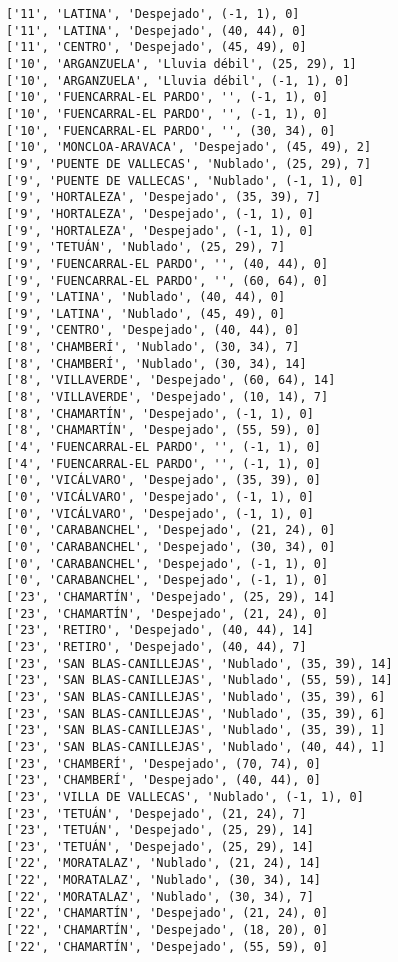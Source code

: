 \documentclass[11pt]{article}
\begin{document}
\begin{Verbatim}[commandchars=\\\{\}]
['11', 'LATINA', 'Despejado', (-1, 1), 0]
['11', 'LATINA', 'Despejado', (40, 44), 0]
['11', 'CENTRO', 'Despejado', (45, 49), 0]
['10', 'ARGANZUELA', 'Lluvia débil', (25, 29), 1]
['10', 'ARGANZUELA', 'Lluvia débil', (-1, 1), 0]
['10', 'FUENCARRAL-EL PARDO', '', (-1, 1), 0]
['10', 'FUENCARRAL-EL PARDO', '', (-1, 1), 0]
['10', 'FUENCARRAL-EL PARDO', '', (30, 34), 0]
['10', 'MONCLOA-ARAVACA', 'Despejado', (45, 49), 2]
['9', 'PUENTE DE VALLECAS', 'Nublado', (25, 29), 7]
['9', 'PUENTE DE VALLECAS', 'Nublado', (-1, 1), 0]
['9', 'HORTALEZA', 'Despejado', (35, 39), 7]
['9', 'HORTALEZA', 'Despejado', (-1, 1), 0]
['9', 'HORTALEZA', 'Despejado', (-1, 1), 0]
['9', 'TETUÁN', 'Nublado', (25, 29), 7]
['9', 'FUENCARRAL-EL PARDO', '', (40, 44), 0]
['9', 'FUENCARRAL-EL PARDO', '', (60, 64), 0]
['9', 'LATINA', 'Nublado', (40, 44), 0]
['9', 'LATINA', 'Nublado', (45, 49), 0]
['9', 'CENTRO', 'Despejado', (40, 44), 0]
['8', 'CHAMBERÍ', 'Nublado', (30, 34), 7]
['8', 'CHAMBERÍ', 'Nublado', (30, 34), 14]
['8', 'VILLAVERDE', 'Despejado', (60, 64), 14]
['8', 'VILLAVERDE', 'Despejado', (10, 14), 7]
['8', 'CHAMARTÍN', 'Despejado', (-1, 1), 0]
['8', 'CHAMARTÍN', 'Despejado', (55, 59), 0]
['4', 'FUENCARRAL-EL PARDO', '', (-1, 1), 0]
['4', 'FUENCARRAL-EL PARDO', '', (-1, 1), 0]
['0', 'VICÁLVARO', 'Despejado', (35, 39), 0]
['0', 'VICÁLVARO', 'Despejado', (-1, 1), 0]
['0', 'VICÁLVARO', 'Despejado', (-1, 1), 0]
['0', 'CARABANCHEL', 'Despejado', (21, 24), 0]
['0', 'CARABANCHEL', 'Despejado', (30, 34), 0]
['0', 'CARABANCHEL', 'Despejado', (-1, 1), 0]
['0', 'CARABANCHEL', 'Despejado', (-1, 1), 0]
['23', 'CHAMARTÍN', 'Despejado', (25, 29), 14]
['23', 'CHAMARTÍN', 'Despejado', (21, 24), 0]
['23', 'RETIRO', 'Despejado', (40, 44), 14]
['23', 'RETIRO', 'Despejado', (40, 44), 7]
['23', 'SAN BLAS-CANILLEJAS', 'Nublado', (35, 39), 14]
['23', 'SAN BLAS-CANILLEJAS', 'Nublado', (55, 59), 14]
['23', 'SAN BLAS-CANILLEJAS', 'Nublado', (35, 39), 6]
['23', 'SAN BLAS-CANILLEJAS', 'Nublado', (35, 39), 6]
['23', 'SAN BLAS-CANILLEJAS', 'Nublado', (35, 39), 1]
['23', 'SAN BLAS-CANILLEJAS', 'Nublado', (40, 44), 1]
['23', 'CHAMBERÍ', 'Despejado', (70, 74), 0]
['23', 'CHAMBERÍ', 'Despejado', (40, 44), 0]
['23', 'VILLA DE VALLECAS', 'Nublado', (-1, 1), 0]
['23', 'TETUÁN', 'Despejado', (21, 24), 7]
['23', 'TETUÁN', 'Despejado', (25, 29), 14]
['23', 'TETUÁN', 'Despejado', (25, 29), 14]
['22', 'MORATALAZ', 'Nublado', (21, 24), 14]
['22', 'MORATALAZ', 'Nublado', (30, 34), 14]
['22', 'MORATALAZ', 'Nublado', (30, 34), 7]
['22', 'CHAMARTÍN', 'Despejado', (21, 24), 0]
['22', 'CHAMARTÍN', 'Despejado', (18, 20), 0]
['22', 'CHAMARTÍN', 'Despejado', (55, 59), 0]

\end{Verbatim}
\end{document}
